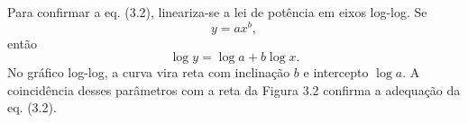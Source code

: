 Para confirmar a eq. (3.2), lineariza-se a lei de potência em eixos log-log. Se
\[
y = a x^b,
\]
então
\[
\log y = \log a + b\log x.
\]
No gráfico log-log, a curva vira reta com inclinação $b$ e intercepto $\log a$. A coincidência desses parâmetros com a reta da Figura 3.2 confirma a adequação da eq. (3.2).

